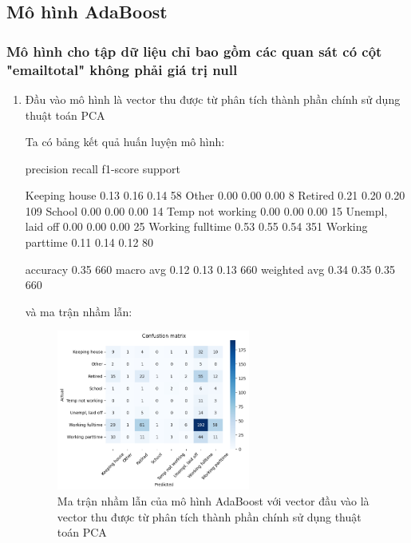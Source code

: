 \subsection{Mô hình AdaBoost}

\subsubsection{Mô hình cho tập dữ liệu chỉ bao gồm các quan sát có cột "emailtotal" không phải giá trị null}

\begin{enumerate}[label=(\alph*)]
    \item Đầu vào mô hình là vector thu được từ phân tích thành phần chính sử dụng thuật toán PCA
    
    Ta có bảng kết quả huấn luyện mô hình:

    \begin{python}
                    precision    recall  f1-score   support

   Keeping house       0.13      0.16      0.14        58
           Other       0.00      0.00      0.00         8
         Retired       0.21      0.20      0.20       109
          School       0.00      0.00      0.00        14
Temp not working       0.00      0.00      0.00        15
Unempl, laid off       0.00      0.00      0.00        25
Working fulltime       0.53      0.55      0.54       351
Working parttime       0.11      0.14      0.12        80

        accuracy                           0.35       660
       macro avg       0.12      0.13      0.13       660
    weighted avg       0.34      0.35      0.35       660

    \end{python}

    và ma trận nhầm lẫn:

    \begin{figure}[H]
        \centering
        \includegraphics[width=0.6\textwidth]{figures/Thanh/Models/AdaBoost/Non_null_models_confusion_matrix_AdaBoost_PCA_features.png}
        \caption{Ma trận nhầm lẫn của mô hình AdaBoost với vector đầu vào là vector thu được từ phân tích thành phần chính sử dụng thuật toán PCA}
        \label{fig:Non_null_models_confusion_matrix_AdaBoost_PCA_features}
    \end{figure}


\end{enumerate}
